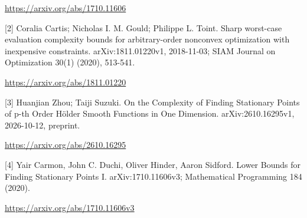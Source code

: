 \documentclass[10pt,a4paper]{article}
\begin{document}
\url{https://arxiv.org/abs/1710.11606}

[2] Coralia Cartis; Nicholas I. M. Gould; Philippe L. Toint. Sharp worst-case evaluation complexity bounds for arbitrary-order nonconvex optimization with inexpensive constraints. arXiv:1811.01220v1, 2018-11-03; SIAM Journal on Optimization 30(1) (2020), 513-541.

\url{https://arxiv.org/abs/1811.01220}

[3] Huanjian Zhou; Taiji Suzuki. On the Complexity of Finding Stationary Points of p-th Order Hölder Smooth Functions in One Dimension. arXiv:2610.16295v1, 2026-10-12, preprint.

\url{https://arxiv.org/abs/2610.16295}

[4] Yair Carmon, John C. Duchi, Oliver Hinder, Aaron Sidford. Lower Bounds for Finding Stationary Points I. arXiv:1710.11606v3; Mathematical Programming 184 (2020).

\url{https://arxiv.org/abs/1710.11606v3}
\end{document}
